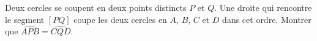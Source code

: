 Deux cercles se coupent en deux points distincts $P$ et $Q$. Une droite qui rencontre le segment $[PQ]$ coupe les deux cercles en $A$, $B$, $C$ et $D$ dans cet ordre. Montrer que $\widehat{APB} = \widehat{CQD}$.
